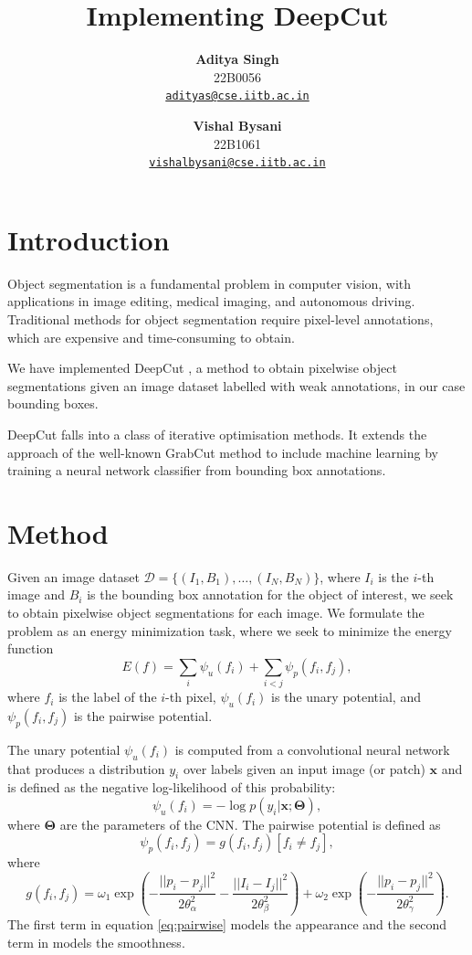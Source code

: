 \documentclass[a4paper]{article}
\title{\huge \bfseries Implementing DeepCut}
\author{
    \textbf{Aditya Singh} \\
    {\normalsize 22B0056} \\
    {\normalsize \href{mailto:adityas@cse.iitb.ac.in}{\texttt{adityas@cse.iitb.ac.in}}} \and
    \textbf{Vishal Bysani} \\
    {\normalsize 22B1061} \\
    {\normalsize \href{mailto:vishalbysani@vishal.iitb.ac.in}{\texttt{vishalbysani@cse.iitb.ac.in}}}}
\date{}
\begin{document}
\maketitle


\section{Introduction}
Object segmentation is a fundamental problem in computer vision, with
applications in image editing, medical imaging, and autonomous driving.
Traditional methods for object segmentation require pixel-level annotations,
which are expensive and time-consuming to obtain.

We have implemented DeepCut \cite{deepcut}, a method to obtain pixelwise object
segmentations given an image dataset labelled with weak annotations, in our case
bounding boxes.

DeepCut falls into a class of iterative optimisation methods. It extends the
approach of the well-known GrabCut \cite{grabcut} method to include machine
learning by training a neural network classifier from bounding box annotations. 


\section{Method}
Given an image dataset $\mathcal{D} = \{(I_1, B_1), \ldots, (I_N, B_N)\}$, where
$I_i$ is the $i$-th image and $B_i$ is the bounding box annotation for the
object of interest, we seek to obtain pixelwise object segmentations for each
image. We formulate the problem as an energy minimization task, where we seek to
minimize the energy function
\begin{equation}
    E(f) = \sum_{i} \psi_u(f_i) + \sum_{i < j} \psi_p(f_i, f_j),\label{eq:energy}
\end{equation}
where $f_i$ is the label of the $i$-th pixel, $\psi_u(f_i)$ is the unary
potential, and $\psi_p(f_i, f_j)$ is the pairwise potential.

The unary potential $\psi_u(f_i)$ is computed from a convolutional neural
network that produces a distribution $y_i$ over labels given an input image (or
patch) $\mathbf{x}$ and is defined as the negative log-likelihood of this
probability: \[
    \psi_u(f_i) = -\log p(y_i | \mathbf{x}; \boldsymbol{\Theta}),
\] where $\boldsymbol{\Theta}$ are the parameters of the CNN. The pairwise
potential is defined as \[
    \psi_p(f_i, f_j) = g(f_i, f_j) [f_i \neq f_j],
\] where
\begin{equation}
        g(f_i, f_j) =
            \omega_1\exp\left(-\frac{||p_i - p_j||^2}{2\theta_{\alpha}^2}
                              -\frac{||I_i - I_j||^2}{2\theta_{\beta}^2}\right)
            + \omega_2\exp\left(-\frac{||p_i - p_j||^2}{2\theta_{\gamma}^2}\right).\label{eq:pairwise}
\end{equation}
The first term in equation \ref{eq:pairwise} models the appearance and the
second term in models the smoothness.
\end{document}
